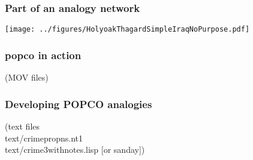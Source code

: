 \documentclass[12pt,xcolor=svgnames]{beamer}
\begin{document}
\begin{frame}\frametitle{Part of an analogy network}
\texttt{[image: ../figures/HolyoakThagardSimpleIraqNoPurpose.pdf]}
\end{frame}


\begin{frame}\frametitle{popco in action}
\begin{center}(MOV files)\end{center}
\end{frame}


\begin{frame}\frametitle{Developing POPCO analogies}
\begin{center}(text files\\
text/crimepropns.nt1\\
text/crime3withnotes.lisp [or sanday])\end{center}
\end{frame}

\end{document}
